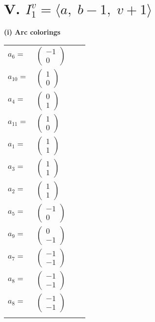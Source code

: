 \documentclass[1p]{elsarticle_modified}
\theoremstyle{definition}
\begin{document}
\centering \section*{V. $I^v_{1}= \langle a,\;b-1,\;v+1 \rangle$}
\flushleft \textbf{(i) Arc colorings}\\
\begin{tabular}{m{7pt} m{180pt} m{7pt} m{180pt} }
\flushright $a_{6}=$&$\begin{pmatrix}-1\\0\end{pmatrix}$ \\
\flushright $a_{10}=$&$\begin{pmatrix}1\\0\end{pmatrix}$ \\
\flushright $a_{4}=$&$\begin{pmatrix}0\\1\end{pmatrix}$ \\
\flushright $a_{11}=$&$\begin{pmatrix}1\\0\end{pmatrix}$ \\
\flushright $a_{1}=$&$\begin{pmatrix}1\\1\end{pmatrix}$ \\
\flushright $a_{3}=$&$\begin{pmatrix}1\\1\end{pmatrix}$ \\
\flushright $a_{2}=$&$\begin{pmatrix}1\\1\end{pmatrix}$ \\
\flushright $a_{5}=$&$\begin{pmatrix}-1\\0\end{pmatrix}$ \\
\flushright $a_{9}=$&$\begin{pmatrix}0\\-1\end{pmatrix}$ \\
\flushright $a_{7}=$&$\begin{pmatrix}-1\\-1\end{pmatrix}$ \\
\flushright $a_{8}=$&$\begin{pmatrix}-1\\-1\end{pmatrix}$\\ \flushright $a_{8}=$&$\begin{pmatrix}-1\\-1\end{pmatrix}$\\&\end{tabular}
\end{document}
